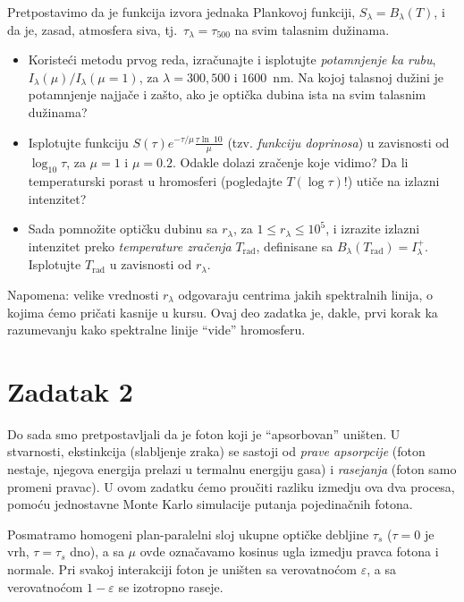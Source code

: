\documentclass[12pt]{article}
\begin{document}
Pretpostavimo da je funkcija izvora jednaka Plankovoj funkciji, $S_\lambda = B_\lambda(T)$, i da je, zasad, atmosfera siva, tj.\ $\tau_\lambda = \tau_{500}$ na svim talasnim du\v{z}inama.

\begin{itemize}

\item Koriste\'{c}i metodu prvog reda, izra\v{c}unajte i isplotujte \emph{potamnjenje ka rubu}, $I_\lambda(\mu)/I_\lambda(\mu=1)$, za $\lambda = 300, 500$ i $1600$~nm. Na kojoj talasnoj du\v{z}ini je potamnjenje najja\v{c}e i za\v{s}to, ako je opti\v{c}ka dubina ista na svim talasnim du\v{z}inama?

\item Isplotujte funkciju $S(\tau)e^{-\tau/\mu} \frac{\tau \ln~10}{\mu}$ (tzv. \emph{funkciju doprinosa}) u zavisnosti od $\log_{10}\tau$, za $\mu=1$ i $\mu=0.2$. Odakle dolazi zra\v{c}enje koje vidimo? Da li temperaturski porast u hromosferi (pogledajte $T(\log\tau)$!) uti\v{c}e na izlazni intenzitet?

\item Sada pomno\v{z}ite opti\v{c}ku dubinu sa $r_\lambda$, za $1 \le r_\lambda \le 10^5$, i izrazite izlazni intenzitet preko \emph{temperature zra\v{c}enja} $T_{\mathrm{rad}}$, definisane sa $B_\lambda(T_{\mathrm{rad}}) = I^+_\lambda$. Isplotujte $T_{\mathrm{rad}}$ u zavisnosti od $r_\lambda$.
\end{itemize}

Napomena: velike vrednosti $r_\lambda$ odgovaraju centrima jakih spektralnih linija, o kojima \'{c}emo pri\v{c}ati kasnije u kursu. Ovaj deo zadatka je, dakle, prvi korak ka razumevanju kako spektralne linije ``vide'' hromosferu.

\section*{Zadatak 2}

Do sada smo pretpostavljali da je foton koji je ``apsorbovan'' uni\v{s}ten. U stvarnosti, ekstinkcija (slabljenje zraka) se sastoji od \emph{prave apsorpcije} (foton nestaje, njegova energija prelazi u termalnu energiju gasa) i \emph{rasejanja} (foton samo promeni pravac). U ovom zadatku \'{c}emo prou\v{c}iti razliku izmedju ova dva procesa, pomo\'{c}u jednostavne Monte Karlo simulacije putanja pojedina\v{c}nih fotona.

Posmatramo homogeni plan-paralelni sloj ukupne opti\v{c}ke debljine $\tau_s$ ($\tau=0$ je vrh, $\tau=\tau_s$ dno), a sa $\mu$ ovde ozna\v{c}avamo kosinus ugla izmedju pravca fotona i normale. Pri svakoj interakciji foton je uni\v{s}ten sa verovatno\'{c}om $\varepsilon$, a sa verovatno\'{c}om $1-\varepsilon$ se izotropno raseje. 
\end{document}
